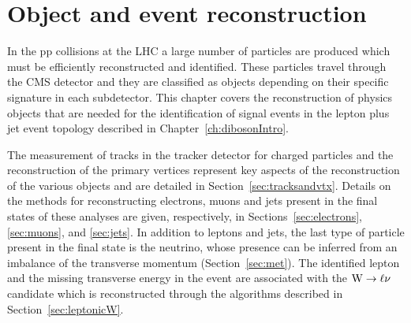 \chapter{Object and event reconstruction}
\label{ch:EventReconstruction}

In the pp collisions at the LHC a large number of particles are produced which must be efficiently reconstructed and identified. These particles travel through the CMS detector and they are classified as objects depending on their specific signature in each subdetector. This chapter covers the reconstruction of physics objects that are needed for the identification of signal events in the lepton plus jet event topology described in Chapter~\ref{ch:dibosonIntro}.

The measurement of tracks in the tracker detector for charged particles and the reconstruction of the primary vertices represent key aspects of the reconstruction of the various objects and are detailed in Section~\ref{sec:tracksandvtx}. Details on the methods for reconstructing electrons, muons and jets present in the final states of these analyses are given, respectively, in Sections~\ref{sec:electrons}, \ref{sec:muons}, and \ref{sec:jets}. %
In addition to leptons and jets, the last type of particle present in the final state is the neutrino, whose presence can be inferred from an imbalance of the transverse momentum (Section~\ref{sec:met}).
The identified lepton and the missing transverse energy in the event are associated with the $\mathrm{W}\to\ell\nu$ candidate which is reconstructed through the algorithms described in Section~\ref{sec:leptonicW}.

 
 
 
 
